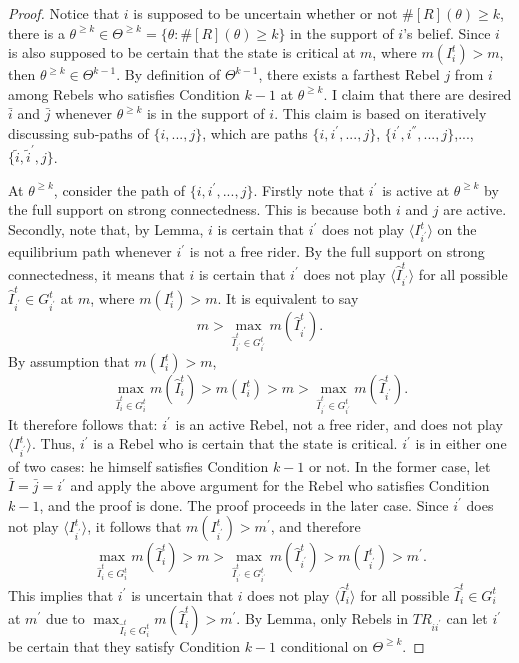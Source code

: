 \documentclass[12pt,letter]{article}
\theoremstyle{definition}
\theoremstyle{remark}
\theoremstyle{claim}
\begin{document}
\begin{proof}
Notice that $i$ is supposed to be uncertain whether or not $\#[R](\theta)\geq k$, there is a $\theta^{\geq k}\in \Theta^{\geq k}=\{\theta:\#[R](\theta)\geq k\}$ in the support of $i$'s belief. Since $i$ is also supposed to be certain that the state is critical at $m$, where $m(I^t_i)>m$, then $\theta^{\geq k}\in \Theta^{k-1}$. By definition of $\Theta^{k-1}$, there exists a farthest Rebel $j$ from $i$ among Rebels who satisfies Condition $k-1$ at $\theta^{\geq k}$. I claim that there are desired $\bar{i}$ and $\bar{j}$ whenever $\theta^{\geq k}$ is in the support of $i$. This claim is based on iteratively discussing sub-paths of $\{i,...,j\}$, which are paths $\{i,i^{'},...,j\}$, $\{i^{'},i^{''},...,j\}$,...,$\{\tilde{i},\tilde{i}^{'},j\}$.

At $\theta^{\geq k}$, consider the path of $\{i,i^{'},...,j\}$. Firstly note that $i^{'}$ is active at $\theta^{\geq k}$ by the full support on strong connectedness. This is because both $i$ and $j$ are active. Secondly, note that, by Lemma, $i$ is certain that $i^{'}$ does not play $\langle I^t_{i^{'}} \rangle$ on the equilibrium path whenever $i^{'}$ is not a free rider. By the full support on strong connectedness, it means that $i$ is certain that $i^{'}$ does not play $\langle \hat{I}^t_{i^{'}} \rangle$ for all possible $\hat{I}^t_{i^{'}}\in G^t_{i^{'}}$ at $m$, where $m(I^t_i)>m$. It is equivalent to say 
\[m>\max_{\hat{I}^t_{i^{'}}\in G^t_{i^{'}}} m(\hat{I}^t_{i^{'}}).\] 
By assumption that $m(I^t_i)>m$, 
\[\max_{\hat{I}^t_{i}\in G^t_{i}} m(\hat{I}^t_{i})>m(I^t_i)>m>\max_{\hat{I}^t_{i^{'}}\in G^t_{i^{'}}} m(\hat{I}^t_{i^{'}}).\] 
It therefore follows that: $i^{'}$ is an active Rebel, not a free rider, and does not play $\langle I^t_{i^{'}} \rangle$. Thus, $i^{'}$ is a Rebel who is certain that the state is critical. $i^{'}$ is in either one of two cases: he himself satisfies Condition $k-1$ or not. In the former case, let $\bar{I}=\bar{j}=i^{'}$ and apply the above argument for the Rebel who satisfies Condition $k-1$, and the proof is done. The proof proceeds in the later case. 
Since $i^{'}$ does not play $\langle I^t_{i^{'}} \rangle$, it follows that $m(I^t_{i^{'}})>m^{'}$, and therefore
\[\max_{\hat{I}^t_{i}\in G^t_{i}} m(\hat{I}^t_{i})>m>\max_{\hat{I}^t_{i^{'}}\in G^t_{i^{'}}} m(\hat{I}^t_{i^{'}})>m(I^t_{i^{'}})>m^{'}.\] 
This implies that $i^{'}$ is uncertain that $i$ does not play $\langle \hat{I}^t_{i} \rangle$ for all possible $\hat{I}^t_{i}\in G^t_{i}$ at $m^{'}$ due to $\max_{\hat{I}^t_{i}\in G^t_{i}} m(\hat{I}^t_{i})>m^{'}$. By Lemma, only Rebels in $TR_{ii^{'}}$ can let $i^{'}$ be certain that they satisfy Condition $k-1$ conditional on $\Theta^{\geq k}$.  


\end{proof}
\end{document}
